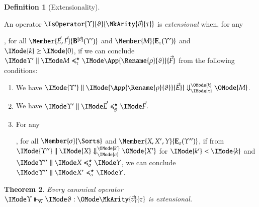 \documentclass[11pt]{article}
\newtheorem{thm}{Theorem}[section]
\theoremstyle{definition}
\newtheorem{definition}[thm]{Definition}
\theoremstyle{notation}
\theoremstyle{remark}
\numberwithin{equation}{section}
\newcommand\EvalN[5]{\IMode{#1}\parallel\IMode{#4}\Downarrow^{\OMode{#3}}_{\IMode{#2}}\OMode{#5}}
\newcommand\Exprs{\mathbf{E}}
\newcommand\BExprs{\mathbf{B}}
\begin{document}
\begin{definition}[Extensionality]
  \label{def:extensionality}

  An operator $\IsOperator{\Upsilon}{\vartheta}{\MkArity{\vec{v}}{\tau}}$ is
  \emph{extensional} when, for any
  , for all $\Member{\vec{E},\vec{F}}{\BExprs^{[\vec{v}]}(\Upsilon')}$ and
  $\Member{M}{\Exprs_\tau(\Upsilon')}$ and $\IMode{k}\geq\IMode{0}$, if we can conclude
  $\PBinRel{\preccurlyeq^\star_\tau}{\Upsilon'}{M}{\App{\Rename{\rho}{\vartheta}}{\vec{F}}}$
  from the following conditions:
  \begin{enumerate}
    \item
      We have $\EvalN{\Upsilon'}{\tau}{k}{\App{\Rename{\rho}{\vartheta}}{\vec{E}}}{M}$.

    \item
      We have $\PBinRel{\preccurlyeq^\star_{\vec{v}}}{\Upsilon'}{\vec{E}}{\vec{F}}$.

    \item
      For any
      , for all $\Member{\sigma}{\Sorts}$ and $\Member{X,X',Y}{\Exprs_\sigma(\Upsilon'')}$, if
      from $\EvalN{\Upsilon''}{\sigma}{k'}{X}{X'}$ for $\IMode{k'}<\IMode{k}$ and
      $\PBinRel{\preccurlyeq^\star_\sigma}{\Upsilon''}{X}{Y}$, we can conclude
      $\PBinRel{\preccurlyeq^\star_\sigma}{\Upsilon''}{X'}{Y}$.
  \end{enumerate}

\end{definition}

\begin{thm}
  Every canonical operator
  $\IsCanOperator{\Upsilon}{\vartheta}{\MkArity{\vec{v}}{\tau}}$ is
  extensional.
\end{thm}
\end{document}
